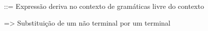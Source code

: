 \begin{simbolos}
  \item[::=] Expressão deriva no contexto de gramáticas livre do contexto 
  \item[=>] Substituição de um não terminal por um terminal
\end{simbolos}
